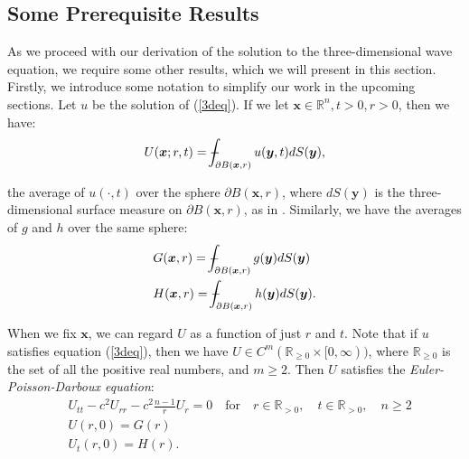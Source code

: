 \documentclass[a4paper, 12pt]{article}
\def\Xint#1{\mathchoice
{\XXint\displaystyle\textstyle{#1}}%
{\XXint\textstyle\scriptstyle{#1}}%
{\XXint\scriptstyle\scriptscriptstyle{#1}}%
{\XXint\scriptscriptstyle\scriptscriptstyle{#1}}%
\!\int}
\def\XXint#1#2#3{{\setbox0=\hbox{$#1{#2#3}{\int}$ }
\vcenter{\hbox{$#2#3$ }}\kern-.6\wd0}}
\def\dashint{\Xint-}
\numberwithin{equation}{section}
\begin{document}
\subsection{Some Prerequisite Results} \label{prereq}
As we proceed with our derivation of the solution to the three-dimensional wave equation, we require
some other results, which we will present in this section. \\

Firstly, we introduce some notation to simplify our work in the upcoming
sections. Let $u$ be the solution of (\ref{3deq}). If we let $\boldsymbol{x}\in
\mathbb{R}^n, t>0, r>0$, then we have:
\begin{equation} \label{averageU}
    U(\boldsymbol{x};r,t)=\dashint_{\partial B(\boldsymbol{x},r)}u(\boldsymbol{y},t)dS(\boldsymbol{y}),
\end{equation}

the average of $u(\cdot,t)$ over the sphere $\partial B(\boldsymbol{x},r)$,
where $dS(\boldsymbol{y})$ is the three-dimensional surface measure on $\partial
B(\boldsymbol{x},r)$, as in \cite[Ch. 2.4.1.b]{Ev}. Similarly, we have the
averages of $g$ and $h$ over the same sphere:
\begin{equation} \label{averageGH}
    \begin{aligned}
        &G(\boldsymbol{x},r)=\dashint_{\partial B(\boldsymbol{x},r)}g(\boldsymbol{y})dS(\boldsymbol{y})\\
        &H(\boldsymbol{x},r)=\dashint_{\partial B(\boldsymbol{x},r)}h(\boldsymbol{y})dS(\boldsymbol{y}).
    \end{aligned}
\end{equation}

When we fix $\boldsymbol{x}$, we can regard $U$ as a function of just $r$ and
$t$. Note that if $u$ satisfies equation (\ref{3deq}), then we have $U \in
C^m(\mathbb{R}_{\ge 0}\times[0,\infty))$, where $\mathbb{R}_{\ge 0}$ is the set
of all the positive real numbers, and $m \ge 2$. Then $U$ satisfies the \emph{Euler-Poisson-Darboux equation}:
\begin{equation} \label{EPDeq}
    \begin{aligned}
        &U_{tt}-c^2U_{rr}-c^2\frac{n-1}{r}U_r=0 \quad \textrm {for} \quad r \in \mathbb{R}_{>0}, \quad t \in \mathbb{R}_{>0}, \quad n \ge 2\\
        &U(r, 0)=G(r)\\
        &U_t(r,0)=H(r).
    \end{aligned}
\end{equation}
\\
\end{document}
